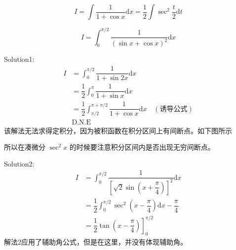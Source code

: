 \begin{example}
    \[
        I = \int \dfrac{1}{1+\cos x} \mathrm{d}x 
          = \dfrac{1}{2} \int \sec^2 \dfrac{t}{2} \mathrm{d}t
    \]
\end{example}

\begin{example}
    \[
        I = \int_0^{\pi/2} \dfrac{1}{(\sin x + \cos x)^2} \mathrm{d}x
    \]

    Solution1:
    \begin{align*}
        I &= \int_0^{\pi/2} \dfrac{1}{1 + \sin 2x} \mathrm{d}x\\
          &= \dfrac{1}{2} \int_{0}^{\pi} \dfrac{1}{1+\sin x} \mathrm{d}x\\
          &= \dfrac{1}{2} \int_{\pi/2}^{\pi + \pi/2} \dfrac{1}{1+\cos x} \mathrm{d}x \quad (\mbox{诱导公式})\\
          &\mbox{D.N.E}
    \end{align*}
    该解法无法求得定积分，因为被积函数在积分区间上有间断点。如下图所示
    \begin{figure}[H]
        \centering
    \end{figure}
    所以在凑微分 $\sec^2 x$ 的时候要注意积分区间内是否出现无穷间断点。

    Solution2:
    \begin{align*}
        I &= \int_0^{\pi /2} \dfrac{1}{\left[\sqrt{2} \sin \left(x+\dfrac{\pi}{4}\right)\right]^2} \mathrm{d}x \\
          &= \dfrac{1}{2} \int_0^{\pi/2} \sec^2 \left(x-\dfrac{\pi}{4}\right)\mathrm{d} x-\dfrac{\pi}{4}\\
          &= \left. \dfrac{1}{2} \tan \left(x - \dfrac{\pi}{4}\right) \right]^{\pi/2}_{0}
    \end{align*}
    解法2应用了辅助角公式，但是在这里，并没有体现辅助角。
\end{example}

